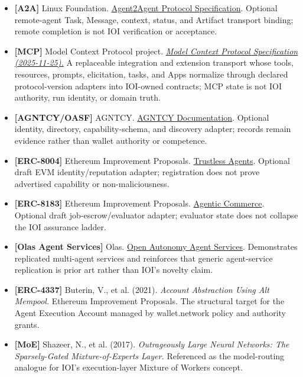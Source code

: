 \documentclass[
  11pt,
]{article}
\providecommand{\tightlist}{%
  \setlength{\itemsep}{0pt}\setlength{\parskip}{0pt}}
\begin{document}
\begin{itemize}
\tightlist
\item
  \textbf{{[}A2A{]}} Linux Foundation. \href{https://a2a-protocol.org/latest/specification/}{Agent2Agent Protocol Specification}.
  Optional remote-agent Task, Message, context, status, and Artifact transport
  binding; remote completion is not IOI verification or acceptance.
\item
  \textbf{{[}MCP{]}} Model Context Protocol project.
  \href{https://modelcontextprotocol.io/specification/2025-11-25}{\emph{Model
  Context Protocol Specification (2025-11-25).}} A replaceable integration and
  extension transport whose tools, resources, prompts, elicitation, tasks, and
  Apps normalize through declared protocol-version adapters into IOI-owned
  contracts; MCP state is not IOI authority, run identity, or domain truth.
\item
  \textbf{{[}AGNTCY/OASF{]}} AGNTCY. \href{https://docs.agntcy.org/}{AGNTCY Documentation}.
  Optional identity, directory, capability-schema, and discovery adapter;
  records remain evidence rather than wallet authority or competence.
\item
  \textbf{{[}ERC-8004{]}} Ethereum Improvement Proposals.
  \href{https://eips.ethereum.org/EIPS/eip-8004}{Trustless Agents}.
  Optional draft EVM identity/reputation adapter; registration does not prove
  advertised capability or non-maliciousness.
\item
  \textbf{{[}ERC-8183{]}} Ethereum Improvement Proposals.
  \href{https://eips.ethereum.org/EIPS/eip-8183}{Agentic Commerce}.
  Optional draft job-escrow/evaluator adapter; evaluator state does not collapse
  the IOI assurance ladder.
\item
  \textbf{{[}Olas Agent Services{]}} Olas.
  \href{https://stack.olas.network/open-autonomy/get_started/what_is_an_agent_service/}{Open Autonomy Agent Services}.
  Demonstrates replicated multi-agent services and reinforces that generic
  agent-service replication is prior art rather than IOI's novelty claim.
\item
  \textbf{{[}ERC-4337{]}} Buterin, V., et al. (2021). \emph{Account
  Abstraction Using Alt Mempool.} Ethereum Improvement Proposals. The
  structural target for the Agent Execution Account managed by
  wallet.network policy and authority grants.
\item
  \textbf{{[}MoE{]}} Shazeer, N., et al. (2017). \emph{Outrageously
  Large Neural Networks: The Sparsely-Gated Mixture-of-Experts Layer.}
  Referenced as the model-routing analogue for IOI's execution-layer
  Mixture of Workers concept.
\end{itemize}
\end{document}
